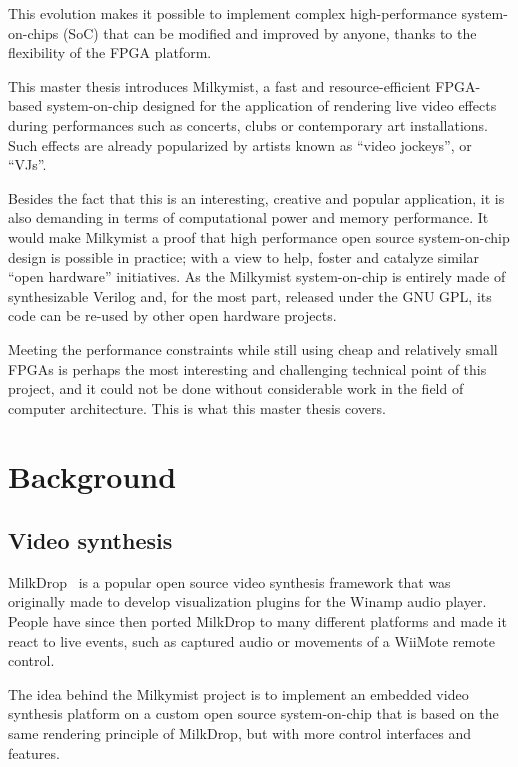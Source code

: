 \documentclass[a4paper,11pt]{kthesis}
\begin{document}
This evolution makes it possible to implement complex high-performance system-on-chips (SoC) that can be modified and improved by anyone, thanks to the flexibility of the FPGA platform.

This master thesis introduces Milkymist\texttrademark \cite{Milkymist}, a fast and resource-efficient FPGA-based system-on-chip designed for the application of rendering live video effects during performances such as concerts, clubs or contemporary art installations. Such effects are already popularized by artists known as ``video jockeys'', or ``VJs''.

Besides the fact that this is an interesting, creative and popular application, it is also demanding in terms of computational power and memory performance. It would make Milkymist a proof that high performance open source system-on-chip design is possible in practice; with a view to help, foster and catalyze similar ``open hardware'' initiatives. As the Milkymist system-on-chip is entirely made of synthesizable Verilog and, for the most part, released under the GNU GPL, its code can be re-used by other open hardware projects.

Meeting the performance constraints while still using cheap and relatively small FPGAs is perhaps the most interesting and challenging technical point of this project, and it could not be done without considerable work in the field of computer architecture. This is what this master thesis covers.

\section{Background}
\subsection{Video synthesis}
MilkDrop~\cite{milkdrop} is a popular open source video synthesis framework that was originally made to develop visualization plugins for the Winamp audio player. People have since then ported MilkDrop to many different platforms and made it react to live events, such as captured audio or movements of a WiiMote remote control.

The idea behind the Milkymist project is to implement an embedded video synthesis platform on a custom open source system-on-chip that is based on the same rendering principle of MilkDrop, but with more control interfaces and features.
\end{document}
